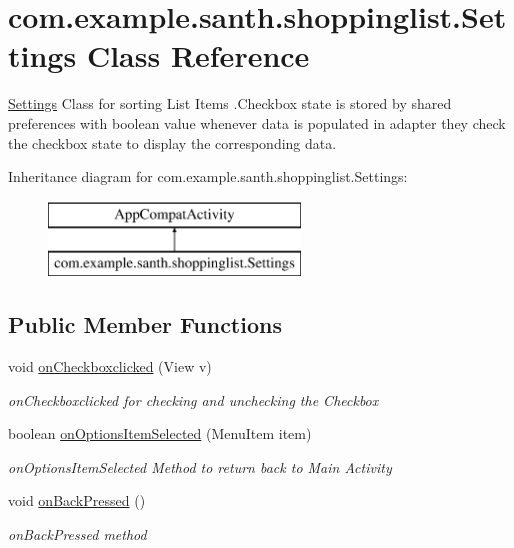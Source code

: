 \hypertarget{classcom_1_1example_1_1santh_1_1shoppinglist_1_1_settings}{}\section{com.\+example.\+santh.\+shoppinglist.\+Settings Class Reference}
\label{classcom_1_1example_1_1santh_1_1shoppinglist_1_1_settings}


\hyperlink{classcom_1_1example_1_1santh_1_1shoppinglist_1_1_settings}{Settings} Class for sorting List Items .Checkbox state is stored by shared preferences with boolean value whenever data is populated in adapter they check the checkbox state to display the corresponding data.  


Inheritance diagram for com.\+example.\+santh.\+shoppinglist.\+Settings\+:\begin{figure}[H]
\begin{center}
\leavevmode
\includegraphics[height=2.000000cm]{classcom_1_1example_1_1santh_1_1shoppinglist_1_1_settings}
\end{center}
\end{figure}
\subsection*{Public Member Functions}
\begin{DoxyCompactItemize}
\item 
void \hyperlink{classcom_1_1example_1_1santh_1_1shoppinglist_1_1_settings_ab3d7fb096bd267535ce81e7de1f5b1de}{on\+Checkboxclicked} (View v)
\begin{DoxyCompactList}\small\item\em on\+Checkboxclicked for checking and unchecking the Checkbox \end{DoxyCompactList}\item 
boolean \hyperlink{classcom_1_1example_1_1santh_1_1shoppinglist_1_1_settings_a3fdebfb081444bff9751e9936bef5442}{on\+Options\+Item\+Selected} (Menu\+Item item)
\begin{DoxyCompactList}\small\item\em on\+Options\+Item\+Selected Method to return back to Main Activity \end{DoxyCompactList}\item 
void \hyperlink{classcom_1_1example_1_1santh_1_1shoppinglist_1_1_settings_ad119e6a9777b8db66609b80d2721e8b1}{on\+Back\+Pressed} ()
\begin{DoxyCompactList}\small\item\em on\+Back\+Pressed method \end{DoxyCompactList}\end{DoxyCompactItemize}
